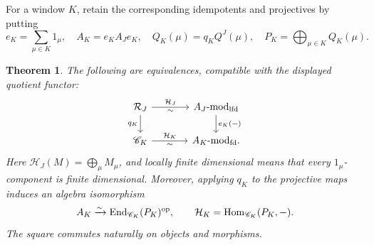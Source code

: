 \documentclass[11pt,reqno]{amsart}
\newcommand{\Hom}{\operatorname{Hom}}\newcommand{\End}{\operatorname{End}}\newcommand{\Ext}{\operatorname{Ext}}
\newtheorem{theorem}{Theorem}[section]
\theoremstyle{definition}
\theoremstyle{remark}
\numberwithin{equation}{section}
\begin{document}
For a window $K$, retain the corresponding idempotents and projectives
by putting
\[
 e_K=\sum_{\mu\in K}1_\mu,\quad A_K=e_KA_Je_K,
 \quad Q_K(\mu)=q_KQ^J(\mu),\quad
 P_K=\bigoplus_{\mu\in K}Q_K(\mu).
\]

\begin{theorem}\label{thm:raw}
The following are equivalences, compatible with the displayed
quotient functor:
\[
 \begin{tikzcd}[column sep=large]
 \RR_J \arrow[r,"\mathcal H_J","\sim"'] \arrow[d,"q_K"'] &
 A_J\text{-}\mathrm{mod}_{\mathrm{lfd}}
       \arrow[d,"e_K(-)"]\\
 \CC_K \arrow[r,"\mathcal H_K","\sim"'] &
 A_K\text{-}\mathrm{mod}_{\mathrm{fd}}.
 \end{tikzcd}
\]
Here $\mathcal H_J(M)=\bigoplus_\mu M_\mu$, and locally finite
dimensional means that every $1_\mu$-component is finite dimensional.
Moreover, applying $q_K$ to the projective maps induces an algebra
isomorphism
\begin{equation}\label{eq:raw-finite}
 A_K\xrightarrow{\sim}
 \End_{\CC_K}(P_K)^{\op},
 \qquad
 \mathcal H_K=\Hom_{\CC_K}(P_K,-).
\end{equation}
The square commutes naturally on objects and morphisms.
\end{theorem}
\end{document}
